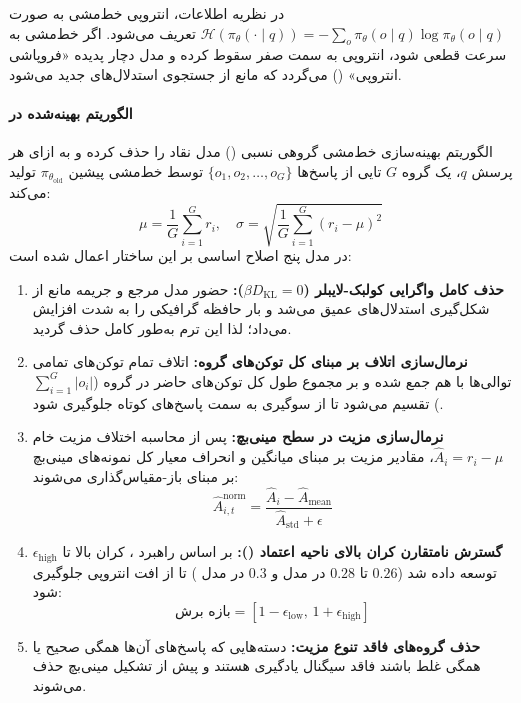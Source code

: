 در نظریه اطلاعات، انتروپی خط‌مشی به صورت $\mathcal{H}(\pi_\theta(\cdot \mid q)) = -\sum_o \pi_\theta(o \mid q) \log \pi_\theta(o \mid q)$ تعریف می‌شود. اگر خط‌مشی به سرعت قطعی شود، انتروپی به سمت صفر سقوط کرده و مدل دچار پدیده «فروپاشی انتروپی» () می‌گردد که مانع از جستجوی استدلال‌های جدید می‌شود.

\paragraph*{الگوریتم  بهینه‌شده در }
الگوریتم بهینه‌سازی خط‌مشی گروهی نسبی () \cite{shao2024deepseekmath} مدل نقاد را حذف کرده و به ازای هر پرسش $q$، یک گروه $G$ تایی از پاسخ‌ها $\{o_1, o_2, \dots, o_G\}$ توسط خط‌مشی پیشین $\pi_{\theta_{\text{old}}}$ تولید می‌کند:
\begin{equation}
    \mu = \frac{1}{G} \sum_{i=1}^G r_i, \quad \sigma = \sqrt{\frac{1}{G} \sum_{i=1}^G (r_i - \mu)^2}
\end{equation}
در مدل  پنج اصلاح اساسی بر این ساختار اعمال شده است:
\begin{enumerate}
    \item \textbf{حذف کامل واگرایی کولبک-لایبلر ($\beta D_{\text{KL}} = 0$):} حضور مدل مرجع و جریمه  مانع از شکل‌گیری استدلال‌های عمیق می‌شد و بار حافظه گرافیکی را به شدت افزایش می‌داد؛ لذا این ترم به‌طور کامل حذف گردید.
    \item \textbf{نرمال‌سازی اتلاف بر مبنای کل توکن‌های گروه:} اتلاف تمام توکن‌های تمامی توالی‌ها با هم جمع شده و بر مجموع طول کل توکن‌های حاضر در گروه ($\sum_{i=1}^G |o_i|$) تقسیم می‌شود تا از سوگیری به سمت پاسخ‌های کوتاه جلوگیری شود.
    \item \textbf{نرمال‌سازی مزیت در سطح مینی‌بچ:} پس از محاسبه اختلاف مزیت خام $\hat{A}_i = r_i - \mu$، مقادیر مزیت بر مبنای میانگین و انحراف معیار کل نمونه‌های مینی‌بچ بر مبنای \cite{andrychowicz2020matters} باز-مقیاس‌گذاری می‌شوند:
    \begin{equation}
        \hat{A}^{\text{norm}}_{i,t} = \frac{\hat{A}_i - \hat{A}_{\text{mean}}}{\hat{A}_{\text{std}} + \epsilon}
    \end{equation}
    \item \textbf{گسترش نامتقارن کران بالای ناحیه اعتماد ():} بر اساس راهبرد \cite{yu2025cliphigher}، کران بالا تا $\epsilon_{\text{high}}$ توسعه داده شد ($0.26$ تا $0.28$ در مدل  و $0.3$ در مدل ) تا از افت انتروپی جلوگیری شود:
    \begin{equation}
        \text{بازه برش} = [1 - \epsilon_{\text{low}}, \, 1 + \epsilon_{\text{high}}]
    \end{equation}
    \item \textbf{حذف گروه‌های فاقد تنوع مزیت:} دسته‌هایی که پاسخ‌های آن‌ها همگی صحیح یا همگی غلط باشند فاقد سیگنال یادگیری هستند و پیش از تشکیل مینی‌بچ حذف می‌شوند.
\end{enumerate}

